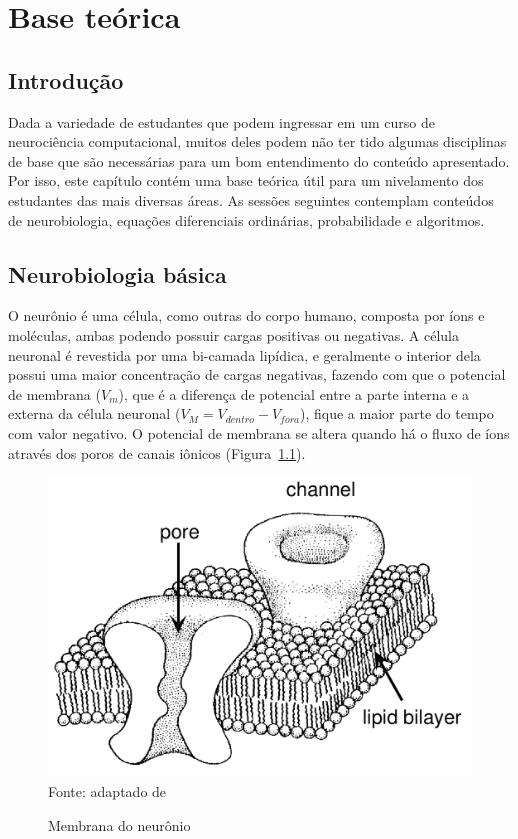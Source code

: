 \chapter{Base teórica}\label{cap:teoria}
\section{Introdução}\label{sec:teoria_intro}
Dada a variedade de estudantes que podem ingressar em um curso de neurociência computacional, muitos deles podem não ter tido algumas disciplinas de base que são necessárias para um bom entendimento do conteúdo apresentado. Por isso, este capítulo contém uma base teórica útil para um nivelamento dos estudantes das mais diversas áreas. As sessões seguintes contemplam conteúdos de neurobiologia, equações diferenciais ordinárias, probabilidade e algoritmos.

\section{Neurobiologia básica}\label{sec:fisiologia}
O neurônio é uma célula, como outras do corpo humano, composta por íons e moléculas, ambas podendo possuir cargas positivas ou negativas. A célula neuronal é revestida por uma bi-camada lipídica, e geralmente o interior dela possui uma maior concentração de cargas negativas, fazendo com que o potencial de membrana ($V_m$), que é a diferença de potencial entre a parte interna e a externa da célula neuronal ($V_M=V_{dentro}-V_{fora}$), fique a maior parte do tempo com valor negativo. O potencial de membrana se altera quando há o fluxo de íons através dos poros de canais iônicos (Figura~\ref{fig:membrananeuronio}).

\begin{figure}[tbh!]
	\centering
	\caption[Membrana do neurônio]{Membrana do neurônio}
	\includegraphics[width=0.55\linewidth]{figs/membrana_neuronio}
	\label{fig:membrananeuronio}
	\\
	Fonte: adaptado de \cite{hille_ionic_1992}
\end{figure}

